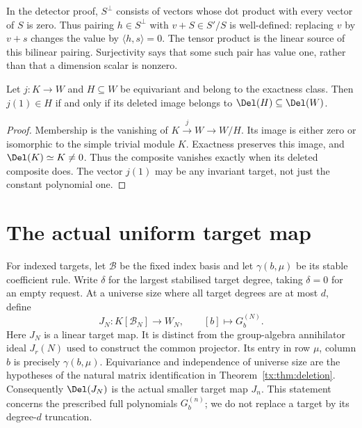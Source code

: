 In the detector proof, $S^\perp$ consists of vectors whose dot product
with every vector of $S$ is zero. Thus pairing $h\in S^\perp$ with
$v+S\in S'/S$ is well-defined: replacing $v$ by $v+s$ changes the
value by $\langle h,s\rangle=0$. The tensor product is the linear
source of this bilinear pairing. Surjectivity says that some such
pair has value one, rather than that a dimension scalar is nonzero.

\begin{lemma}\label{tx:lem:constant}
Let $j:K\to W$ and $H\subseteq W$ be equivariant and belong to the
exactness class. Then $j(1)\in H$ if and only if its deleted image
belongs to $\Del(H)\subseteq\Del(W)$.
\end{lemma}
\begin{proof}
Membership is the vanishing of $K\xrightarrow{j}W\to W/H$.
Its image is either zero or isomorphic to the simple trivial module
$K$. Exactness preserves this image, and $\Del(K)\simeq K\ne0$.
Thus the composite vanishes exactly when its deleted composite does.
The vector $j(1)$ may be any invariant target, not just the constant
polynomial one.
\end{proof}

\section{The actual uniform target map}\label{tx:sec:target-transfer}
For indexed targets, let $\mathcal B$ be the fixed index basis and
let $\gamma(b,\mu)$ be its stable coefficient rule. Write $\delta$ for the largest stabilised target degree, taking
$\delta=0$ for an empty request. At a universe size where
all target degrees are at most $d$, define
\[
 J_N:K[\mathcal B_N]\longrightarrow W_N,\qquad
                [b]\longmapsto G_b^{(N)}.
\]
Here $J_N$ is a linear target map. It is distinct from the group-algebra
annihilator ideal $J_r(N)$ used to construct the common projector.
Its entry in row $\mu$, column $b$ is precisely $\gamma(b,\mu)$.
Equivariance and independence of universe size are the hypotheses of the natural
matrix identification in Theorem~\ref{tx:thm:deletion}. Consequently
$\Del(J_N)$ is the actual smaller target map $J_n$.
This statement concerns the prescribed full polynomials $G_b^{(n)}$;
we do not replace a target by its degree-$d$ truncation.

